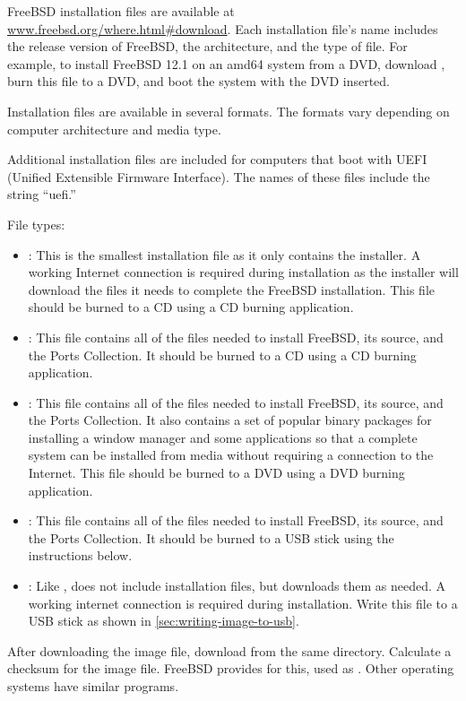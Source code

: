 FreeBSD installation files are available at \url{www.freebsd.org/where.html#download}.
Each installation file's name includes the release version of FreeBSD, the architecture, and the type of file.
For example, to install FreeBSD 12.1 on an amd64 system from a DVD, download , burn this file to a DVD, and boot the system with the DVD inserted.

Installation files are available in several formats.
The formats vary depending on computer architecture and media type.

Additional installation files are included for computers that boot with UEFI (Unified Extensible Firmware Interface).
The names of these files include the string ``uefi.''

File types:
\begin{itemize}
\item
   :
   This is the smallest installation file as it only contains the installer.
   A working Internet connection is required during installation 
   as the installer will download the files it needs to complete the FreeBSD installation.
   This file should be burned to a CD using a CD burning application.
\item 
   :
   This file contains all of the files needed to install FreeBSD, its source, and the Ports Collection.
   It should be burned to a CD using a CD burning application.
\item
   :
   This file contains all of the files needed to install FreeBSD, its source, and the Ports Collection.
   It also contains a set of popular binary packages for installing a window manager and some applications so that a complete system can be installed from media without requiring a connection to the Internet. 
   This file should be burned to a DVD using a DVD burning application.
\item
   :
   This file contains all of the files needed to install FreeBSD, its source, and the Ports Collection.
   It should be burned to a USB stick using the instructions below.
\item
   :
   Like , does not include installation files, but downloads them as needed.
   A working internet connection is required during installation.
   Write this file to a USB stick as shown in \vref{sec:writing-image-to-usb}.
\end{itemize}
After downloading the image file, download  from the same directory.
Calculate a checksum for the image file.
FreeBSD provides  for this, used as .
Other operating systems have similar programs.

